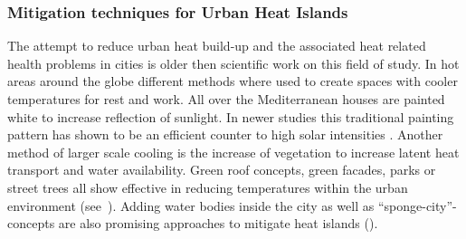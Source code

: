 \documentclass[12pt,a4paper, english,twoside]{article}
\begin{document}
    \subsubsection{Mitigation techniques for Urban Heat Islands}\label{ssec:mitigation}
      The attempt to reduce urban heat build-up and the associated heat related health problems in cities is older then scientific work on this field of study. 
      In hot areas around the globe different methods where used to create spaces with cooler temperatures for rest and work. 
      All over the Mediterranean houses are painted white to increase reflection of sunlight. 
      In newer studies this traditional painting pattern has shown to be an efficient counter to high solar intensities \autocite{Fayad2021}.
      Another method of larger scale cooling is the increase of vegetation to increase latent heat transport and water availability.
      Green roof concepts, green facades, parks or street trees all show effective in reducing temperatures within the urban environment (see~\cite{Ramamurthy2014, Feyisa2014, Dimoudi2003, Gartland2008}).
      Adding water bodies inside the city as well as ``sponge-city''-concepts are also promising approaches to mitigate heat islands (\cite{He2019}).
\end{document}

